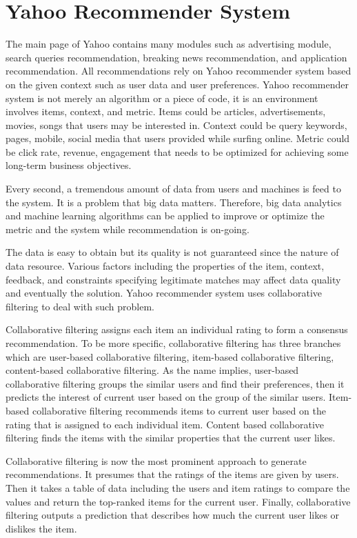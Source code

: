 \documentclass[sigconf]{acmart}
\begin{document}
\section{Yahoo Recommender System}
The main page of Yahoo contains many modules such as advertising module, search queries recommendation, breaking news recommendation, and application recommendation. All recommendations rely on Yahoo recommender system based on the given context such as user data and user preferences. Yahoo recommender system is not merely an algorithm or a piece of code, it is an environment involves items, context, and metric. Items could be articles, advertisements, movies, songs that users may be interested in. Context could be query keywords, pages, mobile, social media that users provided while surfing online. Metric could be click rate, revenue, engagement that needs to be optimized for achieving some long-term business objectives\cite{Reco2}.
\par
Every second, a tremendous amount of data from users and machines is feed to the system. It is a problem that big data matters. Therefore, big data analytics and machine learning algorithms can be applied to improve or optimize the metric and the system while recommendation is on-going. 
\par
The data is easy to obtain but its quality is not guaranteed since the nature of data resource. Various factors including the properties of the item, context, feedback, and constraints specifying legitimate matches may affect data quality and eventually the solution. Yahoo recommender system uses collaborative filtering to deal with such problem.
\par
Collaborative filtering assigns each item an individual rating to form a consensus recommendation. To be more specific, collaborative filtering has three branches which are user-based collaborative filtering, item-based collaborative filtering, content-based collaborative filtering. As the name implies, user-based collaborative filtering groups the similar users and find their preferences, then it predicts the interest of current user based on the group of the similar users. Item-based collaborative filtering recommends items to current user based on the rating that is assigned to each individual item. Content based collaborative filtering finds the items with the similar properties that the current user likes\cite{Reco2}. 
\par
Collaborative filtering is now the most prominent approach to generate recommendations. It presumes that the ratings of the items are given by users. Then it takes a table of data including the users and item ratings to compare the values and return the top-ranked items for the current user\cite{Reco2}. Finally, collaborative filtering outputs a prediction that describes how much the current user likes or dislikes the item. 
\end{document}
